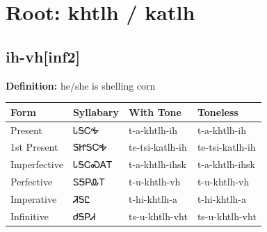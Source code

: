 \documentclass{article}%
\begin{document}
%
\normalsize%
\section*{Root: khtlh / katlh}%
\subsection*{ih-vh[inf2]}%
\textbf{Definition: }%
he/she is shelling corn%
\\[0.5em]%
\begin{tabular}{|l|l|l|l|}%
\hline%
\textbf{Form}&\textbf{Syllabary}&\textbf{With Tone}&\textbf{Toneless}\\%
\hline%
Present&ᏓᎦᏟᎭ&t{-}a{-}khtlh{-}ih&t{-}a{-}khtlh{-}ih\\%
1st Present&ᏕᏥᎦᏟᎭ&te{-}tsi{-}katlh{-}ih&te{-}tsi{-}katlh{-}ih\\%
Imperfective&ᏓᎦᏟᏍᎪᎢ&t{-}a{-}khtlh{-}ihsk&t{-}a{-}khtlh{-}ihsk\\%
Perfective&ᏚᎦᏢᎲᎢ&t{-}u{-}khtlh{-}vh&t{-}u{-}khtlh{-}vh\\%
Imperative&ᏘᎦᏝ&t{-}hi{-}khtlh{-}a&t{-}hi{-}khtlh{-}a\\%
Infinitive&ᏧᎦᏢᏗ&ts{-}u{-}khtlh{-}vht&ts{-}u{-}khtlh{-}vht\\%
\hline%
\end{tabular}%
\\[1em]%
\end{document}
